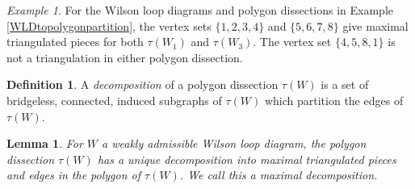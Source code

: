 \documentclass[11pt]{article}
\newtheorem{lem}[thm]{Lemma}
\theoremstyle{remark}
\newtheorem{eg}[thm]{Example}
\theoremstyle{definition}
\newtheorem{dfn}[thm]{Definition}
\begin{document}
\begin{eg} \label{eg: unique decomposition} For the Wilson loop diagrams and polygon dissections in Example \ref{WLDtopolygonpartition}, the vertex sets $\{1, 2, 3,4\}$ and $\{5, 6, 7, 8\}$ give maximal triangulated pieces for both $\tau(W_1)$ and $\tau(W_3)$. The vertex set $\{4,5, 8, 1\}$ is not a triangulation in either polygon dissection. 
\end{eg}

\begin{dfn}
 A {\em decomposition} of a polygon dissection $\tau(W)$ is a set of bridgeless, connected, induced subgraphs of $\tau(W)$ which partition the edges of $\tau(W)$.  
\end{dfn}

\begin{lem} \label{decompositionlem}
  For $W$ a weakly admissible Wilson loop diagram, the polygon dissection $\tau(W)$ has a unique decomposition into maximal triangulated pieces and edges in the polygon of $\tau(W)$.  We call this a \emph{maximal decomposition}.
\end{lem}
\end{document}
